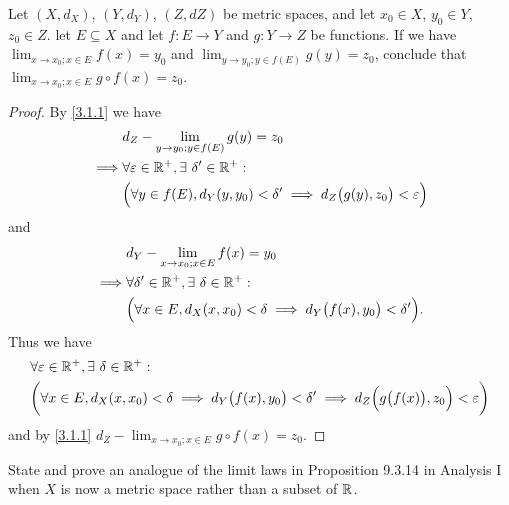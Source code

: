 \begin{ex}\label{ex:3.1.5}
  Let \((X, d_X)\), \((Y, d_Y)\), \((Z, d Z)\) be metric spaces, and let \(x_0 \in X\), \(y_0 \in Y\), \(z_0 \in Z\).
  let \(E \subseteq X\) and let \(f : E \to Y\) and \(g : Y \to Z\) be functions.
  If we have \(\lim_{x \to x_0 ; x \in E} f(x) = y_0\) and \(\lim_{y \to y_0 ; y \in f(E)} g(y) = z_0\), conclude that \(\lim_{x \to x_0 ; x \in E} g \circ f(x) = z_0\).
\end{ex}

\begin{proof}
  By \cref{3.1.1} we have
  \begin{align*}
             & d_Z - \lim_{y \to y_0 ; y \in f(E)} g(y) = z_0                                                    \\
    \implies & \forall \varepsilon \in \mathbb{R}^+, \exists\ \delta' \in \mathbb{R}^+ :                                         \\
             & \Big(\forall y \in f(E), d_Y(y, y_0) < \delta' \implies d_Z\big(g(y), z_0\big) < \varepsilon\Big)
  \end{align*}
  and
  \begin{align*}
             & d_Y - \lim_{x \to x_0 ; x \in E} f(x) = y_0                                                \\
    \implies & \forall \delta' \in \mathbb{R}^+, \exists\ \delta \in \mathbb{R}^+ :                                       \\
             & \Big(\forall x \in E, d_X(x, x_0) < \delta \implies d_Y\big(f(x), y_0\big) < \delta'\Big).
  \end{align*}
  Thus we have
  \begin{align*}
     & \forall \varepsilon \in \mathbb{R}^+, \exists\ \delta \in \mathbb{R}^+ :                                                                                             \\
     & \bigg(\forall x \in E, d_X(x, x_0) < \delta \implies d_Y\big(f(x), y_0\big) < \delta' \implies d_Z\Big(g\big(f(x)\big), z_0\Big) < \varepsilon\bigg)
  \end{align*}
  and by \cref{3.1.1} \(d_Z - \lim_{x \to x_0 ; x \in E} g \circ f(x) = z_0\).
\end{proof}

\begin{ex}\label{ex:3.1.6}
  State and prove an analogue of the limit laws in Proposition 9.3.14 in Analysis I when \(X\) is now a metric space rather than a subset of \(\mathbb{R}\).
\end{ex}

